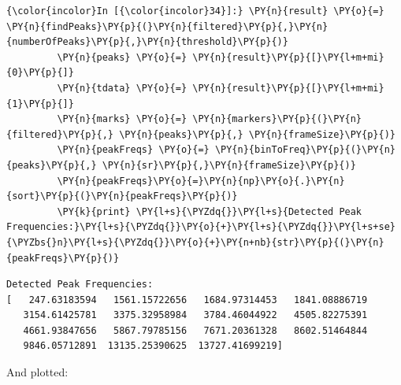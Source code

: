     \begin{Verbatim}[commandchars=\\\{\}]
{\color{incolor}In [{\color{incolor}34}]:} \PY{n}{result} \PY{o}{=} \PY{n}{findPeaks}\PY{p}{(}\PY{n}{filtered}\PY{p}{,}\PY{n}{numberOfPeaks}\PY{p}{,}\PY{n}{threshold}\PY{p}{)}
         \PY{n}{peaks} \PY{o}{=} \PY{n}{result}\PY{p}{[}\PY{l+m+mi}{0}\PY{p}{]}
         \PY{n}{tdata} \PY{o}{=} \PY{n}{result}\PY{p}{[}\PY{l+m+mi}{1}\PY{p}{]}
         \PY{n}{marks} \PY{o}{=} \PY{n}{markers}\PY{p}{(}\PY{n}{filtered}\PY{p}{,} \PY{n}{peaks}\PY{p}{,} \PY{n}{frameSize}\PY{p}{)}
         \PY{n}{peakFreqs} \PY{o}{=} \PY{n}{binToFreq}\PY{p}{(}\PY{n}{peaks}\PY{p}{,} \PY{n}{sr}\PY{p}{,}\PY{n}{frameSize}\PY{p}{)}
         \PY{n}{peakFreqs}\PY{o}{=}\PY{n}{np}\PY{o}{.}\PY{n}{sort}\PY{p}{(}\PY{n}{peakFreqs}\PY{p}{)}
         \PY{k}{print} \PY{l+s}{\PYZdq{}}\PY{l+s}{Detected Peak Frequencies:}\PY{l+s}{\PYZdq{}}\PY{o}{+}\PY{l+s}{\PYZdq{}}\PY{l+s+se}{\PYZbs{}n}\PY{l+s}{\PYZdq{}}\PY{o}{+}\PY{n+nb}{str}\PY{p}{(}\PY{n}{peakFreqs}\PY{p}{)}
\end{Verbatim}

    \begin{Verbatim}[commandchars=\\\{\}]
Detected Peak Frequencies:
[   247.63183594   1561.15722656   1684.97314453   1841.08886719
   3154.61425781   3375.32958984   3784.46044922   4505.82275391
   4661.93847656   5867.79785156   7671.20361328   8602.51464844
   9846.05712891  13135.25390625  13727.41699219]
    \end{Verbatim}

    And plotted:


